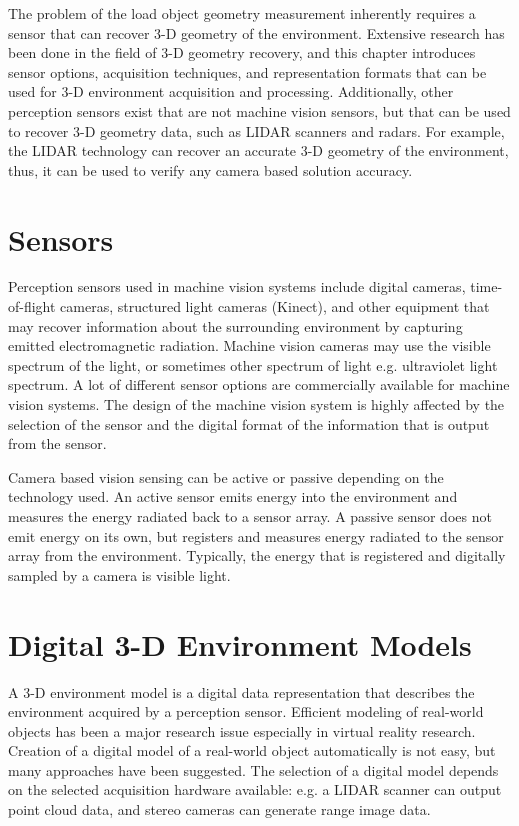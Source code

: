 \documentclass[12pt,a4paper,oneside,pdftex]{report}
\begin{document}
The problem of the load object geometry measurement inherently requires a sensor that can recover 3-D geometry of the environment. Extensive research has been done in the field of 3-D geometry recovery, and this chapter introduces sensor options, acquisition techniques, and representation formats that can be used for 3-D environment acquisition and processing. Additionally, other perception sensors exist that are not machine vision sensors, but that can be used to recover 3-D geometry data, such as LIDAR scanners and radars. For example, the LIDAR technology can recover an accurate 3-D geometry of the environment, thus, it can be used to verify any camera based solution accuracy\citep{You11}.

\section{Sensors}

Perception sensors used in machine vision systems include digital cameras, time-of-flight cameras, structured light cameras (Kinect), and other equipment that may recover information about the surrounding environment by capturing emitted electromagnetic radiation. Machine vision cameras may use the visible spectrum of the light, or sometimes other spectrum of light e.g. ultraviolet light spectrum. A lot of different sensor options are commercially available for machine vision systems. The design of the machine vision system is highly affected by the selection of the sensor and the digital format of the information that is output from the sensor.

Camera based vision sensing can be active or passive depending on the technology used. An active sensor emits energy into the environment and measures the energy radiated back to a sensor array. A passive sensor does not emit energy on its own, but registers and measures energy radiated to the sensor array from the environment. Typically, the energy that is registered and digitally sampled by a camera is visible light.

\section{Digital 3-D Environment Models}
\label{section:digital_3d_environment_models}

A 3-D environment model is a digital data representation that describes the environment acquired by a perception sensor. Efficient modeling of real-world objects has been a major research issue especially in virtual reality research. Creation of a digital model of a real-world object automatically is not easy, but many approaches have been suggested. The selection of a digital model depends on the selected acquisition hardware available: e.g. a LIDAR scanner can output point cloud data, and stereo cameras can generate range image data. 
\end{document}
